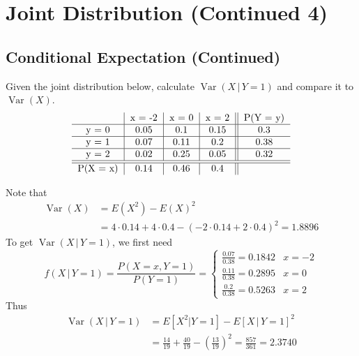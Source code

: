 \documentclass[notoc,notitlepage]{tufte-book}
\DeclareMathOperator{\Var}{Var }
\begin{document}
\section{Joint Distribution (Continued 4)}%
\label{sec:joint_distribution_continued_4}

\subsection{Conditional Expectation (Continued)}%
\label{sub:conditional_expectation_continued}

\begin{eg}[Example 3.22]
  Given the joint distribution below, calculate $\Var(X \, | \, Y = 1)$ and compare it to $\Var(X)$.
  \[
  \begin{tabular}{c | c | c | c || c}
            & x = -2 & x = 0 & x = 2 & P(Y = y) \\
  \hline
  y = 0     & 0.05   & 0.1   & 0.15  & 0.3 \\
  \hline
  y = 1     & 0.07   & 0.11  & 0.2   & 0.38 \\
  \hline
  y = 2     & 0.02   & 0.25  & 0.05  & 0.32 \\
  \hline
  \hline
  P(X = x)  & 0.14   & 0.46  & 0.4   &
  \end{tabular}
  \]
\end{eg}

\begin{solution}
  Note that
  \begin{align*}
    \Var(X) &= E(X^2) - E(X)^2 \\
      &= 4 \cdot 0.14 + 4 \cdot 0.4 - ( -2 \cdot 0.14 + 2 \cdot 0.4 )^2 = 1.8896
  \end{align*}
  To get $\Var(X \, | \, Y = 1)$, we first need
  \begin{equation*}
    f(X \, | \, Y = 1) = \frac{P(X = x, Y = 1)}{P(Y = 1)} = \begin{cases}
      \frac{0.07}{0.38} = 0.1842 & x = -2 \\
      \frac{0.11}{0.38} = 0.2895 & x = 0 \\
      \frac{0.2}{0.38} = 0.5263 & x = 2
    \end{cases}
  \end{equation*}
  Thus
  \begin{align*}
    \Var(X \, | \, Y = 1) &= E[ X^2 | Y = 1 ] - E[ X \, | \, Y = 1 ]^2 \\
      &= \frac{14}{19} + \frac{40}{19} - ( \frac{13}{19} )^2 = \frac{857}{361} = 2.3740
  \end{align*}
\end{solution}
\end{document}
